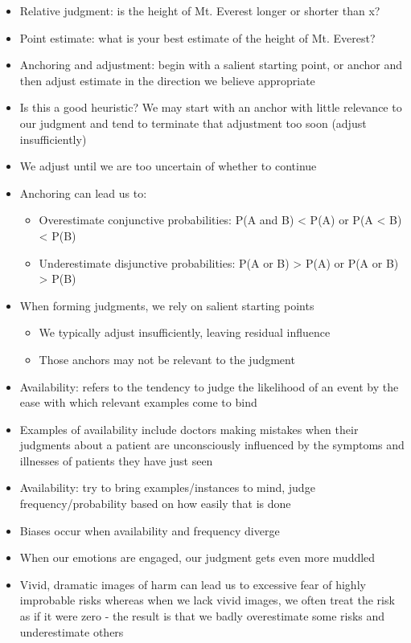 \documentclass[12pt]{article}
\begin{document}
\begin{itemize}
\item Relative judgment: is the height of Mt. Everest longer or shorter than x? 
\item Point estimate: what is your best estimate of the height of Mt. Everest? 
\item Anchoring and adjustment: begin with a salient starting point, or anchor and then adjust estimate in the direction we believe appropriate 
\item Is this a good heuristic? We may start with an anchor with little relevance to our judgment and tend to terminate that adjustment too soon (adjust insufficiently)
\item We adjust until we are too uncertain of whether to continue 
\item Anchoring can lead us to: \begin{itemize} 
\item Overestimate conjunctive probabilities: P(A and B) < P(A) or P(A < B) < P(B)
\item Underestimate disjunctive probabilities: P(A or B) > P(A) or P(A or B) > P(B) 
\end{itemize} 
\item When forming judgments, we rely on salient starting points \begin{itemize} 
\item We typically adjust insufficiently, leaving residual influence 
\item Those anchors may not be relevant to the judgment \end{itemize} 
\item Availability: refers to the tendency to judge the likelihood of an event by the ease with which relevant examples come to bind 
\item Examples of availability include doctors making mistakes when their judgments about a patient are unconsciously influenced by the symptoms and illnesses of patients they have just seen 
\item Availability: try to bring examples/instances to mind, judge frequency/probability based on how easily that is done 
\item Biases occur when availability and frequency diverge 
\item When our emotions are engaged, our judgment gets even more muddled 
\item Vivid, dramatic images of harm can lead us to excessive fear of highly improbable risks whereas when we lack vivid images, we often treat the risk as if it were zero - the result is that we badly overestimate some risks and underestimate others 

\end{itemize}
\end{document}
